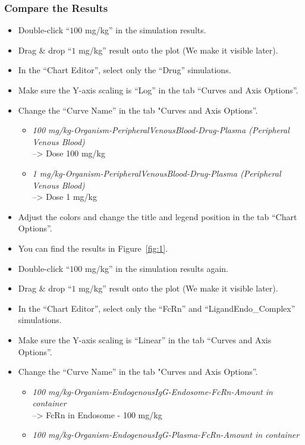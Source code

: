 \documentclass[fleqn,10pt]{physiome}
\begin{document}
\subsubsection{Compare the Results}
\begin{itemize}
    \item Double-click ``$100$ mg/kg'' in the simulation results.
    \item Drag \& drop ``$1$ mg/kg'' result onto the plot (We make it visible later).
    \item In the ``Chart Editor'', select only the ``Drug'' simulations.
    \item Make sure the Y-axis scaling is ``Log'' in the tab ``Curves and Axis Options''.
    \item Change the ``Curve Name'' in the tab "Curves and Axis Options''.
    \begin{itemize}
        \item \textit{100 mg/kg-Organism-PeripheralVenousBlood-Drug-Plasma (Peripheral Venous Blood)} 
        \\--> Dose 100 mg/kg
        \item \textit{1 mg/kg-Organism-PeripheralVenousBlood-Drug-Plasma (Peripheral Venous Blood)} 
        \\--> Dose 1 mg/kg
    \end{itemize}
    \item Adjust the colors and change the title and legend position in the tab ``Chart Options''.
    \item You can find the results in Figure~\ref{fig:1}.
    \item Double-click ``$100$ mg/kg'' in the simulation results again.
    \item Drag \& drop ``$1$ mg/kg'' result onto the plot (We make it visible later).
    \item In the ``Chart Editor'', select only the ``FcRn'' and ``LigandEndo\_Complex'' simulations.
    \item Make sure the Y-axis scaling is ``Linear'' in the tab ``Curves and Axis Options''.
    \item Change the ``Curve Name'' in the tab "Curves and Axis Options''.
    \begin{itemize}
        \item \textit{100 mg/kg-Organism-EndogenousIgG-Endosome-FcRn-Amount in container} 
        \\--> FcRn in Endosome - 100 mg/kg
        \item \textit{100 mg/kg-Organism-EndogenousIgG-Plasma-FcRn-Amount in container} 

\end{itemize}
\end{itemize}
\end{document}
